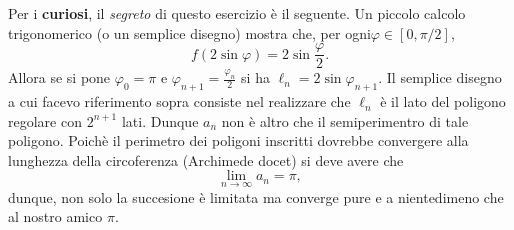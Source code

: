 \documentclass{report}
\newcommand{\vf}{\varphi}
\begin{document}
\begin{enumerate}
Per i {\bf curiosi}, il {\sl segreto} di questo esercizio \`e il seguente.
Un piccolo calcolo trigonomerico (o un semplice disegno) mostra che,
per ogni$\vf\in[0,\pi/2]$,
\[
f(2\sin\vf)=2\sin\frac\vf 2.
\]
Allora se si pone $\vf_0=\pi$ e $\vf_{n+1}=\frac{\vf_n}2$ si ha
$\ell_n=2\sin\vf_{n+1}$. Il semplice disegno a cui facevo riferimento
sopra consiste nel realizzare che $\ell_n$ \`e il lato del poligono
regolare con $2^{n+1}$ lati. Dunque $a_n$ non \`e altro che il
semiperimentro di tale poligono. Poich\`e il perimetro dei poligoni
inscritti dovrebbe convergere alla lunghezza della circoferenza
(Archimede docet) si deve avere che
\[
\lim_{n\to\infty}a_n=\pi,
\]
dunque, non solo la succesione \`e limitata ma converge pure e a
nientedimeno che al nostro
amico $\pi$.
\end{enumerate}
\end{document}
